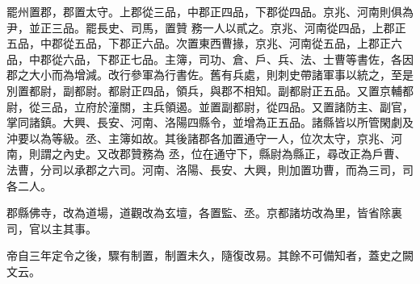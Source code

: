 \begin{pinyinscope}
 罷州置郡，郡置太守。上郡從三品，中郡正四品，下郡從四品。京兆、河南則俱為尹，並正三品。罷長史、司馬，置贊
 務一人以貳之。京兆、河南從四品，上郡正五品，中郡從五品，下郡正六品。次置東西曹掾，京兆、河南從五品，上郡正六品，中郡從六品，下郡正七品。主簿，司功、倉、戶、兵、法、士曹等書佐，各因郡之大小而為增減。改行參軍為行書佐。舊有兵處，則刺史帶諸軍事以統之，至是別置都尉，副都尉。都尉正四品，領兵，與郡不相知。副都尉正五品。又置京輔都尉，從三品，立府於潼關，主兵領遏。並置副都尉，從四品。又置諸防主、副官，掌同諸鎮。大興、長安、河南、洛陽四縣令，並增為正五品。諸縣皆以所管閑劇及沖要以為等級。丞、主簿如故。其後諸郡各加置通守一人，位次太守，京兆、河南，則謂之內史。又改郡贊務為
 丞，位在通守下，縣尉為縣正，尋改正為戶曹、法曹，分司以承郡之六司。河南、洛陽、長安、大興，則加置功曹，而為三司，司各二人。



 郡縣佛寺，改為道場，道觀改為玄壇，各置監、丞。京都諸坊改為里，皆省除裏司，官以主其事。



 帝自三年定令之後，驟有制置，制置未久，隨復改易。其餘不可備知者，蓋史之闕文云。



\end{pinyinscope}